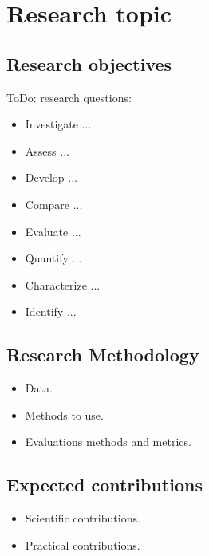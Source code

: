 \chapter{Research topic}

\section{Research objectives}
ToDo: research questions:

\begin{itemize}
    \item Investigate ...
    \item Assess ...
    \item Develop ...
    \item Compare ...
    \item Evaluate ...
    \item Quantify ...
    \item Characterize ...
    \item Identify ...
\end{itemize}

\section{Research Methodology}
\begin{itemize}
    \item Data.
    \item Methods to use.
    \item Evaluations methods and metrics.
\end{itemize}

\section{Expected contributions}

\begin{itemize}
    \item Scientific contributions.
    \item Practical contributions.
\end{itemize}
